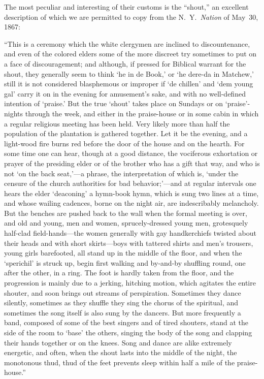 \documentclass[a5paper,10pt]{book}
\begin{document}
The most peculiar and interesting of their customs is the ``shout,''
an excellent description of which we are permitted to copy from the
N.~Y.~\emph{Nation} of May~30, 1867:

``This is a ceremony which the white clergymen are inclined to
discountenance, and even of the colored elders some of the more
discreet try sometimes to put on a face of discouragement; and
although, if pressed for Biblical warrant for the shout, they
generally seem to think `he in de Book,' or `he dere-da in Matchew,'
still it is not considered blasphemous or improper if `de chillen' and
`dem young gal' carry it on in the evening for amusement's sake, and
with no well-defined intention of `praise.'  But the true `shout'
takes place on Sundays or on `praise'-nights through the week, and
either in the praise-house or in some cabin in which a regular
religious meeting has been held.  Very likely more than half the
population of the plantation is gathered together.  Let it be the
evening, and a light-wood fire burns red before the door of the house
and on the hearth.  For some time one can hear, though at a good
distance, the vociferous exhortation or prayer of the presiding elder
or of the brother who has a gift that way, and who is not `on the back
seat,'---a phrase, the interpretation of which is, `under the censure
of the church authorities for bad behavior;'---and at regular
intervals one hears the elder `deaconing' a hymn-book hymn, which is
sung two lines at a time, and whose wailing cadences, borne on the
night air, are indescribably melancholy.  But the benches are pushed
back to the wall when the formal meeting is over, and old and young,
men and women, sprucely-dressed young men, grotesquely half-clad
field-hands---the women generally with gay handkerchiefs twisted about
their heads and with short skirts---boys with tattered shirts and
men's trousers, young girls barefooted, all stand up in the middle of
the floor, and when the `sperichil' is struck up, begin first walking
and by-and-by shuffling round, one after the other, in a ring.  The
foot is hardly taken from the floor, and the progression is mainly due
to a jerking, hitching motion, which agitates the entire shouter, and
soon brings out streams of perspiration.  Sometimes they dance
silently, sometimes as they shuffle they sing the chorus of the
spiritual, and sometimes the song itself is also sung by the dancers.
But more frequently a band, composed of some of the best singers and
of tired shouters, stand at the side of the room to `base' the others,
singing the body of the song and clapping their hands together or on
the knees.  Song and dance are alike extremely energetic, and often,
when the shout lasts into the middle of the night, the monotonous
thud, thud of the feet prevents sleep within half a mile of the
praise-house.''
\end{document}
